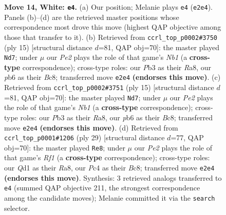 \documentclass[11pt]{article}
\begin{document}
\begin{figure}[p]
\caption{\textbf{Move 14, White: \texttt{e4}.} (a) Our position; Melanie plays \texttt{e4} (\texttt{e2e4}). Panels (b)--(d) are the retrieved master positions whose correspondence most drove this move (highest QAP objective among those that transfer to it). (b) Retrieved from \texttt{ccrl\_top\_p0002\#3750} (ply 15) [structural distance $d$=81, QAP obj=70]: the master played \texttt{Nd7}; under $\mu$ our \emph{Pe2} plays the role of that game's \emph{Nb1} (a \textbf{cross-type} correspondence); cross-type roles: our \emph{P}b3 as their \emph{R}a8, our \emph{p}b6 as their \emph{B}c8; transferred move \texttt{e2e4} \textbf{(endorses this move)}. (c) Retrieved from \texttt{ccrl\_top\_p0002\#3751} (ply 15) [structural distance $d$=81, QAP obj=70]: the master played \texttt{Nd7}; under $\mu$ our \emph{Pe2} plays the role of that game's \emph{Nb1} (a \textbf{cross-type} correspondence); cross-type roles: our \emph{P}b3 as their \emph{R}a8, our \emph{p}b6 as their \emph{B}c8; transferred move \texttt{e2e4} \textbf{(endorses this move)}. (d) Retrieved from \texttt{ccrl\_top\_p0001\#1206} (ply 29) [structural distance $d$=77, QAP obj=70]: the master played \texttt{Re8}; under $\mu$ our \emph{Pe2} plays the role of that game's \emph{Rf1} (a \textbf{cross-type} correspondence); cross-type roles: our \emph{Q}d1 as their \emph{R}a8, our \emph{P}c4 as their \emph{B}c8; transferred move \texttt{e2e4} \textbf{(endorses this move)}. Synthesis: 3 retrieved analogs transferred to \texttt{e4} (summed QAP objective 211, the strongest correspondence among the candidate moves); Melanie committed it via the \texttt{search} selector.}
\label{fig:thought-m26}
\end{figure}

\clearpage
\end{document}

